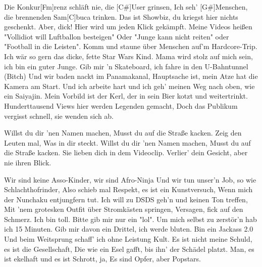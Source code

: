 

\begin{guitar}
	Die Konkur[Fm]renz schläft nie, die [C#]User grinsen,
	Ich seh' [G#]Menschen, die brennenden Sam[C]buca trinken.
	Das ist Showbiz, du kriegst hier nichts geschenkt.
	Aber, dick! Hier wird um jeden Klick gekämpft.
	Meine Videos heißen "Vollidiot will Luftballon besteigen"
	Oder "Junge kann nicht reiten" oder "Football in die Leisten".
	Komm und staune über Menschen auf'm Hardcore-Trip.
	Ich wär so gern das dicke, fette Star Wars Kind.
	Mama wird stolz auf mich sein, ich bin ein guter Junge.
	Gib mir 'n Skateboard, ich fahre in den U-Bahntunnel (Bitch)
	Und wir baden nackt im Panamakanal,
	Hauptsache ist, mein Atze hat die Kamera am Start.
	Und ich arbeite hart und ich geh' meinen Weg nach oben, wie ein Saiyajin.
	Mein Vorbild ist der Kerl, der in sein Bier kotzt und weitertrinkt.
	Hunderttausend Views hier werden Legenden gemacht,
	Doch das Publikum vergisst schnell, sie wenden sich ab.
	
	Willst du dir 'nen Namen machen,
	Musst du auf die Straße kacken.
	Zeig den Leuten mal,
	Was in dir steckt.
	Willst du dir 'nen Namen machen,
	Musst du auf die Straße kacken.
	Sie lieben dich in dem Videoclip.
	Verlier' dein Gesicht, aber nie ihren Blick.
	
	\pagebreak
	
	Wir sind keine Asso-Kinder, wir sind Afro-Ninja
	Und wir tun unser'n Job, so wie Schlachthofrinder,
	Also schieb mal Respekt, es ist ein Kunstversuch,
	Wenn mich der Nunchaku entjungfern tut.
	Ich will zu DSDS geh'n und keinen Ton treffen,
	Mit 'nem grotesken Outfit über Stromkästen springen,
	Versagen, fick auf den Schmerz. Ich bin toll.
	Bitte gib mir nur ein "lol".
	Um mich selbst zu zerstör'n hab ich 15 Minuten.
	Gib mir davon ein Drittel, ich werde bluten.
	Bin ein Jackass 2.0
	Und beim Weitsprung schaff' ich ohne Leistung Kult.
	Es ist nicht meine Schuld, es ist die Gesellschaft,
	Die wie ein Esel gafft, bis ihn' der Schädel platzt.
	Man, es ist ekelhaft und es ist Schrott, ja,
	Es sind Opfer, aber Popstars.
	
	 
\end{guitar}